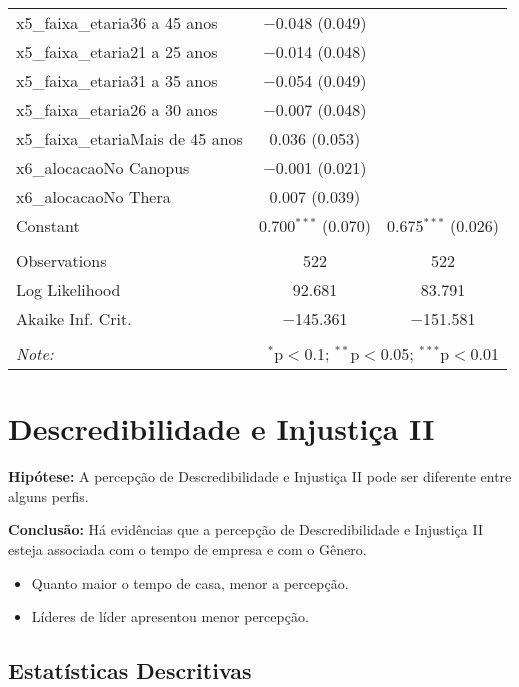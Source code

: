 \documentclass[]{book}
\providecommand{\tightlist}{%
  \setlength{\itemsep}{0pt}\setlength{\parskip}{0pt}}
\begin{document}
\begin{table}[!htbp]
\begin{tabular}{@{\extracolsep{5pt}}lcc}
  x5\_faixa\_etaria36 a 45 anos & $-$0.048 (0.049) &  \\ 
  x5\_faixa\_etaria21 a 25 anos & $-$0.014 (0.048) &  \\ 
  x5\_faixa\_etaria31 a 35 anos & $-$0.054 (0.049) &  \\ 
  x5\_faixa\_etaria26 a 30 anos & $-$0.007 (0.048) &  \\ 
  x5\_faixa\_etariaMais de 45 anos & 0.036 (0.053) &  \\ 
  x6\_alocacaoNo Canopus & $-$0.001 (0.021) &  \\ 
  x6\_alocacaoNo Thera & 0.007 (0.039) &  \\ 
  Constant & 0.700$^{***}$ (0.070) & 0.675$^{***}$ (0.026) \\ 
 \hline \\[-1.8ex] 
Observations & 522 & 522 \\ 
Log Likelihood & 92.681 & 83.791 \\ 
Akaike Inf. Crit. & $-$145.361 & $-$151.581 \\ 
\hline 
\hline \\[-1.8ex] 
\textit{Note:}  & \multicolumn{2}{r}{$^{*}$p$<$0.1; $^{**}$p$<$0.05; $^{***}$p$<$0.01} \\ 
\end{tabular} 
\end{table}

\pagebreak

\hypertarget{descredibilidade-e-injustica-ii}{%
\section{Descredibilidade e Injustiça II}\label{descredibilidade-e-injustica-ii}}

\textbf{Hipótese:} A percepção de Descredibilidade e Injustiça II pode ser diferente entre alguns perfis.

\textbf{Conclusão:} Há evidências que a percepção de Descredibilidade e Injustiça II esteja associada com o tempo de empresa e com o Gênero.

\begin{itemize}
\tightlist
\item
  Quanto maior o tempo de casa, menor a percepção.
\item
  Líderes de líder apresentou menor percepção.
\end{itemize}

\hypertarget{estatisticas-descritivas-1}{%
\subsection{Estatísticas Descritivas}\label{estatisticas-descritivas-1}}
\end{document}
